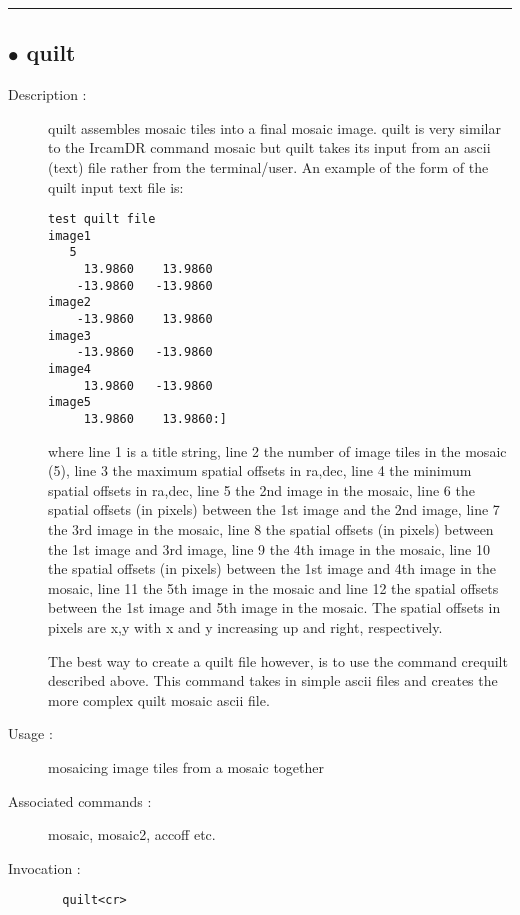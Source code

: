 \hrule \subsection*{$\bullet$ quilt}
\begin{description}
\item[Description :] quilt assembles mosaic tiles into a final mosaic image.  quilt is
very similar to the IrcamDR command mosaic but quilt takes its input from
an ascii (text) file rather from the terminal/user.  An example of the
form of the quilt input text file is:

\begin{verbatim}
test quilt file
image1
   5
     13.9860    13.9860
    -13.9860   -13.9860
image2
    -13.9860    13.9860
image3
    -13.9860   -13.9860
image4
     13.9860   -13.9860
image5
     13.9860    13.9860:]
\end{verbatim}

where line 1 is a title string, line 2 the number of image tiles in the
mosaic (5), line 3 the maximum spatial offsets in ra,dec, line 4 the
minimum spatial offsets in ra,dec, line 5 the 2nd image in the mosaic,
line 6 the spatial offsets (in pixels) between the 1st image and the 2nd
image, line 7 the 3rd image in the mosaic, line 8 the spatial offsets (in
pixels) between the 1st image and 3rd image, line 9 the 4th image in the
mosaic, line 10 the spatial offsets (in pixels) between the 1st image and
4th image in the mosaic, line 11 the 5th image in the mosaic and line 12
the spatial offsets between the 1st image and 5th image in the mosaic.
The spatial offsets in pixels are x,y with x and y increasing up and
right, respectively.

The best way to create a quilt file however, is to use the command
crequilt described above.  This command takes in simple ascii files and
creates the more complex quilt mosaic ascii file.

\item[Usage :] mosaicing image tiles from a mosaic together
\item[Associated commands :] mosaic, mosaic2, accoff etc.
\item[Invocation :]

\verb+  quilt<cr> +\end{description}

